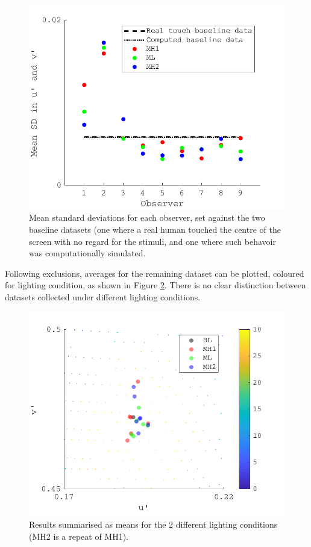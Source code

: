 \begin{figure}[hbtp] 
\includegraphics[max width=\textwidth]{figs/tablet/exp3excl.pdf} 
\caption{Mean standard deviations for each observer, set against the two baseline datasets (one where a real human touched the centre of the screen with no regard for the stimuli, and one where such behavoir was computationally simulated.}
\label{fig:exp3excl}
\end{figure}


Following exclusions, averages for the remaining dataset can be plotted, coloured for lighting condition, as shown in Figure \ref{fig:PAMELA_20180205_results}. There is no clear distinction between datasets collected under different lighting conditions.

\begin{figure}[hbtp] %
\includegraphics[max width=\textwidth]{figs/tablet/PAMELA_20180205_results.pdf} 
\caption{Results summarised as means for the 2 different lighting conditions (MH2 is a repeat of MH1).}
\label{fig:PAMELA_20180205_results}
\end{figure}

